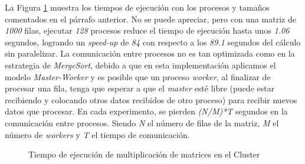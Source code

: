 La Figura \ref{fig:mult_matrices_cluster} muestra los tiempos de ejecución con los procesos y tamaños comentados en el párrafo anterior. No se puede apreciar, pero con una matriz de \textit{1000} filas, ejecutar \textit{128} procesos reduce el tiempo de ejecución hasta unos \textit{1.06} segundos, logrando un \textit{speed-up} de \textit{84} con respecto a los \textit{89.1} segundos del cálculo sin paralelizar. La comunicación entre procesos no es tan optimizada como en la estrategia de \textit{MergeSort}, debido a que en esta implementación aplicamos el modelo \textit{Master-Worker} y es posible que un proceso \textit{worker}, al finalizar de procesar una fila, tenga que esperar a que el \textit{master} esté libre (puede estar recibiendo y colocando otros datos recibidos de otro proceso) para recibir nuevos datos que procesar. En cada experimento, se pierden \textit{(N/M)*T} segundos en la comunicación entre procesos. Siendo \textit{N} el número de filas de la matriz, \textit{M} el número de \textit{workers} y \textit{T} el tiempo de comunicación.

\begin{figure}[!h]
	\hspace{-0.07\textwidth} 
	\caption{Tiempo de ejecución de multiplicación de matrices en el Cluster}
	\label{fig:mult_matrices_cluster}
\end{figure}





